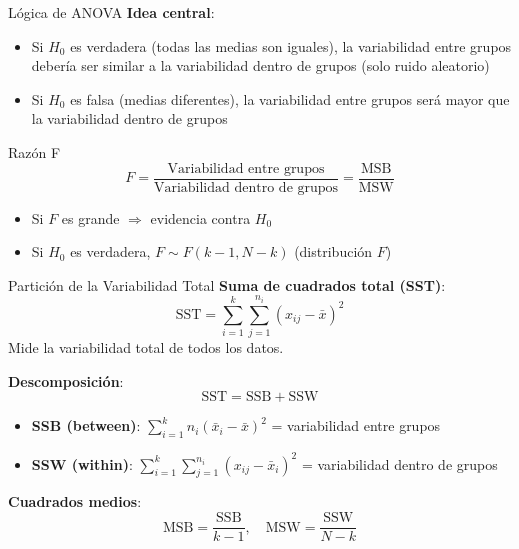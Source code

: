 \documentclass[aspectratio=169, 11pt]{beamer}
\begin{document}
\begin{frame}{Lógica de ANOVA}
\textbf{Idea central}:
\begin{itemize}
  \item Si $H_0$ es verdadera (todas las medias son iguales), la variabilidad entre grupos debería ser similar a la variabilidad dentro de grupos (solo ruido aleatorio)
  \item Si $H_0$ es falsa (medias diferentes), la variabilidad entre grupos será \alert{mayor} que la variabilidad dentro de grupos
\end{itemize}

\vspace{0.3cm}
\begin{block}{Razón F}
\[
F = \frac{\text{Variabilidad entre grupos}}{\text{Variabilidad dentro de grupos}} = \frac{\text{MSB}}{\text{MSW}}
\]
\begin{itemize}
  \item Si $F$ es grande $\Rightarrow$ evidencia contra $H_0$
  \item Si $H_0$ es verdadera, $F \sim F(k-1, N-k)$ (distribución $F$)
\end{itemize}
\end{block}
\end{frame}

\begin{frame}{Partición de la Variabilidad Total}
\textbf{Suma de cuadrados total (SST)}:
\[
\text{SST} = \sum_{i=1}^k \sum_{j=1}^{n_i} (x_{ij} - \bar{x})^2
\]
Mide la variabilidad total de todos los datos.

\vspace{0.3cm}
\textbf{Descomposición}:
\[
\text{SST} = \text{SSB} + \text{SSW}
\]
\begin{itemize}
  \item \textbf{SSB (between)}: $\sum_{i=1}^k n_i (\bar{x}_i - \bar{x})^2$ = variabilidad entre grupos
  \item \textbf{SSW (within)}: $\sum_{i=1}^k \sum_{j=1}^{n_i} (x_{ij} - \bar{x}_i)^2$ = variabilidad dentro de grupos
\end{itemize}

\vspace{0.3cm}
\textbf{Cuadrados medios}:
\[
\text{MSB} = \frac{\text{SSB}}{k-1}, \quad \text{MSW} = \frac{\text{SSW}}{N-k}
\]
\end{frame}
\end{document}
